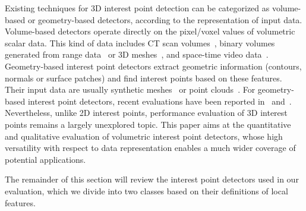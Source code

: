 Existing techniques for 3D interest point detection can be categorized as volume-based or geometry-based detectors, according to the representation of input data. Volume-based detectors operate directly on the pixel/voxel values of volumetric scalar data. This kind of data includes CT scan volumes~\cite{Flitton2010}, binary volumes generated from range data~\cite{Viksten2008} or 3D meshes~\cite{Knopp2010}, and space-time video data~\cite{Koelstra2009,Laptev2005,Willems2008,Yu2010}. Geometry-based interest point detectors extract geometric information (\eg contours, normals or surface patches) and find interest points based on these features. Their input data are usually synthetic meshes~\cite{Glomb2009,Sipiran2011,Zaharescu2009} or point clouds~\cite{Unnikrishnan2008,Aanaes2012}. For geometry-based interest point detectors, recent evaluations have been reported in~\cite{Salti2011} and~\cite{Dutagaci2011}.  
Nevertheless, unlike 2D interest points, performance evaluation of 3D interest points remains a largely unexplored topic. 
This paper aims at the quantitative and qualitative evaluation of volumetric interest point detectors, whose high versatility with respect to data representation enables a much wider coverage of potential applications.

The remainder of this section will review the interest point detectors used in our evaluation, which we divide into two classes based on their definitions of local features.


